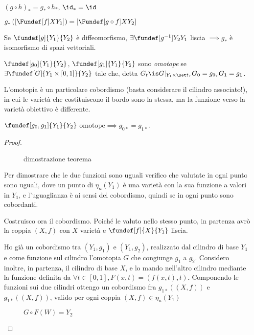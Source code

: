 

\begin{oss}
 $(g\circ h )_* = g_*\circ h_*$,
 $\id_* = \id$
\end{oss}
$g_*\left(\left[\Fundef[f]X{Y_1} \right]\right) = \left[\Fundef[g\circ f]X {Y_2} \right]$
\begin{oss}
 Se $\fundef[g]{Y_1}{Y_2}$ è diffeomorfismo, $\exists \fundef[g^{-1}]{Y_2}{Y_1}$ liscia $\implies g_*$ è isomorfismo di spazi vettoriali.
\end{oss}
\begin{defn}[Omotopia]
 $\fundef[g_0]{Y_1}{Y_2}$, $\fundef[g_1]{Y_1}{Y_2}$ sono \emph{omotope} se $\exists \fundef[G]{Y_1\times\left[ 0,1\right]}{Y_2}$ tale che,
 detta $G_t\is  G|_{Y_1\times \set t}, G_0=g_0, G_1=g_1$.
\end{defn}
 \begin{oss}
  L'omotopia è un particolare cobordismo (basta considerare il cilindro associato!), in cui le varietà che costituiscono il bordo sono la stessa, ma la funzione verso la varietà obiettivo è differente.
 \end{oss}
\begin{prop}
 $\fundef[g_0, g_1]{Y_1}{Y_2}$ omotope$\implies g_{0*}=g_{1*}$.
\end{prop}
\begin{proof}
 \begin{figure}
  \centering
  
  \caption{dimostrazione teorema}
 \end{figure}
 Per dimostrare che le due funzioni sono uguali verifico che valutate in ogni punto sono uguali, dove un punto di $\eta_n(Y_1)$ è una varietà con la sua funzione a valori in $Y_1$, e l'uguaglianza è ai sensi del cobordismo, quindi se in ogni punto sono cobordanti.

 Costruisco ora il cobordismo. Poiché le valuto nello stesso punto, in partenza avrò la coppia $(X,f)$ con $X$ varietà e $\fundef[f]{X}{Y_1}$ liscia.

 Ho già un cobordismo tra $(Y_1, g_1)$ e $(Y_1, g_2)$, realizzato dal cilindro di base $Y_1$ e come funzione sul cilindro l'omotopia $G$ che congiunge $g_1$ a $g_2$. Considero inoltre, in partenza, il cilindro di base $X$, e lo mando nell'altro cilindro mediante la funzione definita da $\forall t\in \left[ 0,1\right], F(x,t)=(f(x,t), t)$. Componendo le funzioni sui due cilindri ottengo un cobordismo fra $g_{1*}((X,f))$ e $g_{1*}((X,f))$, valido per ogni coppia $(X,f) \in \eta_n(Y_1)$
  \begin{figure}
  \centering
  
  \caption{$G\circ F (W) = Y_2$}
 \end{figure}
\end{proof}

